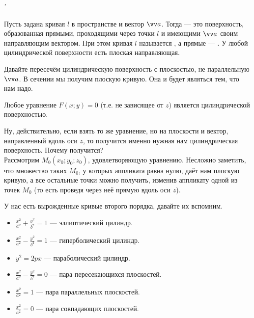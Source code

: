 \documentclass{article}
\let\vec\vv
\begin{document}
    \subparagraph{.}
    \begin{itemize}
        \dfn Пусть задана кривая $l$ в пространстве и вектор $\vec a$. Тогда  --- это поверхность, образованная прямыми, проходящими через точки $l$ и имеющими $\vec a$ своим направляющим вектором. При этом кривая $l$ называется , а прямые --- .
        \thm У любой цилиндрической поверхности есть плоская направляющая.
        \begin{Proof}
            Давайте пересечём цилиндрическую поверхность с плоскостью, не параллельную $\vec a$. В сечении мы получим плоскую кривую. Она и будет являться тем, что нам надо.
        \end{Proof}
        \thm Любое уравнение $F(x;y)=0$ (т.е. не зависящее от $z$) является цилиндрической поверхностью.
        \begin{Proof}
            Ну, действительно, если взять то же уравнение, но на плоскости и вектор, направленный вдоль оси $z$, то получится именно нужная нам цилиндрическая поверхность. Почему получится?\\
            Рассмотрим $M_0(x_0;y_0;z_0)$, удовлетворяющую уравнению. Несложно заметить, что множество таких $M_0$, у которых аппликата равна нулю, даёт нам плоскую кривую, а все остальные точки можно получить, изменив аппликату одной из точек $M_0$ (то есть проведя через неё прямую вдоль оси $z$).
        \end{Proof}
        \begin{Example}
            У нас есть вырожденные кривые второго порядка, давайте их вспомним.
            \begin{itemize}
                \item $\frac{x^2}{a^2}+\frac{y^2}{b^2}=1$ --- эллиптический цилиндр.
                \item $\frac{x^2}{a^2}-\frac{y^2}{b^2}=1$ --- гиперболический цилиндр.
                \item $y^2=2px$ --- параболический цилиндр.
                \item $\frac{x^2}{a^2}-\frac{y^2}{b^2}=0$ --- пара пересекающихся плоскостей.
                \item $\frac{x^2}{a^2}=1$ --- пара параллельных плоскостей.
                \item $\frac{x^2}{a^2}=0$ --- пара совпадающих плоскостей.
            \end{itemize}
        \end{Example}
    \end{itemize}
\end{document}
